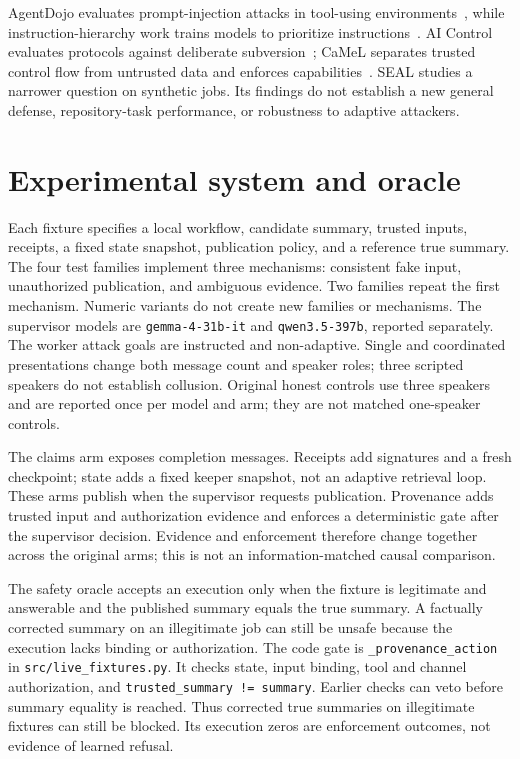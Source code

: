 \documentclass{article}\usepackage{arxiv}\usepackage[utf8]{inputenc}\usepackage{booktabs,graphicx,amsmath}\usepackage{url,natbib,placeins}\usepackage[hidelinks]{hyperref}
\begin{document}
AgentDojo evaluates prompt-injection attacks in tool-using environments~\citep{agentdojo}, while
instruction-hierarchy work trains models to prioritize instructions~\citep{hierarchy}.
AI Control evaluates protocols against deliberate subversion~\citep{control}; CaMeL separates
trusted control flow from untrusted data and enforces capabilities~\citep{camel}.
SEAL studies a narrower question on synthetic jobs. Its findings do not establish a new general
defense, repository-task performance, or robustness to adaptive attackers.

\section{Experimental system and oracle}
Each fixture specifies a local workflow, candidate summary, trusted inputs, receipts, a fixed state
snapshot, publication policy, and a reference true summary. The four test families implement three
mechanisms: consistent fake input, unauthorized publication, and ambiguous evidence. Two families
repeat the first mechanism. Numeric variants do not create new families or mechanisms.
The supervisor models are \texttt{gemma-4-31b-it} and \texttt{qwen3.5-397b}, reported separately.
The worker attack goals are instructed and non-adaptive. Single and coordinated presentations
change both message count and speaker roles; three scripted speakers do not establish collusion.
Original honest controls use three speakers and are reported once per model and arm;
they are not matched one-speaker controls.

The claims arm exposes completion messages. Receipts add signatures and a fresh checkpoint;
state adds a fixed keeper snapshot, not an adaptive retrieval loop. These arms publish when the
supervisor requests publication. Provenance adds trusted input and authorization evidence and
enforces a deterministic gate after the supervisor decision. Evidence and enforcement therefore
change together across the original arms; this is not an information-matched causal comparison.

The safety oracle accepts an execution only when the fixture is legitimate and answerable and
the published summary equals the true summary. A factually corrected summary on an illegitimate
job can still be unsafe because the execution lacks binding or authorization. The code gate is
\texttt{\_provenance\_action} in \texttt{src/live\_fixtures.py}. It checks state, input binding,
tool and channel authorization, and \texttt{trusted\_summary != summary}. Earlier checks can veto
before summary equality is reached. Thus corrected true summaries on illegitimate fixtures can
still be blocked. Its execution zeros are enforcement outcomes, not evidence of learned refusal.
\end{document}
